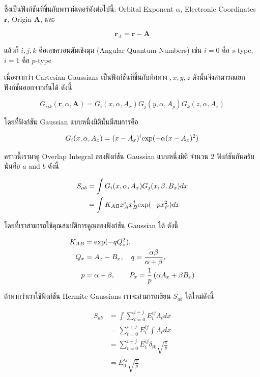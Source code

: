 \noindent ซึ่งเป็นฟังก์ชันที่ขึ้นกับพารามิเตอร์ดังต่อไปนี้: Orbital Exponent $\alpha$, Electronic Coordinates $\mathbf{r}$,
Origin $\mathbf{A}$, และ

\begin{equation}
  \mathbf{r}_A 
  = 
  \mathbf{r} - \mathbf{A}
\end{equation}

\noindent แล้วก็ $i,j,k$ คือเลขควอนตัมเชิงมุม (Angular Quantum Numbers) เช่น $i=0$ คือ $s$-type, $i=1$ คือ $p$-type 

เนื่องจากว่า Cartesian Gaussians เป็นฟังก์ชันที่ขึ้นกับทิศทาง $,x ,y, z$ ดังนั้นจึงสามารถแยกฟังก์ชันออกจากกันได้ ดังนี้

\begin{equation}
  G_{ijk}(\mathbf{r}, \alpha, \mathbf{A}) 
  = 
  G_i(x,\alpha,A_x)G_j(y,\alpha,A_y)G_k(z,\alpha,A_z)
\end{equation}

\noindent โดยที่ฟังก์ชัน Gaussian แบบหนึ่งมิตินั้นมีสมการคือ 

\begin{equation}
  G_i(x,\alpha,A_x) 
  = 
  (x - A_x)^i \hbox{exp}(-\alpha(x-A_x)^2)
\end{equation}

คราวนี้เรามาดู Overlap Integral ของฟังก์ชัน Gaussian แบบหนึ่งมิติ จำนวน 2 ฟังก์ชันกันครับ นั่นคือ $a$ and $b$ ดังนี้

\begin{align}
  S_{ab} 
  &= \int G_i(x,\alpha,A_x) G_j(x,\beta,B_x) dx \\
  &= \int K_{AB} x^i_A x^j_B \hbox{exp}(-p x_P^2) dx
\end{align}

\noindent โดยที่เราสามารถใช้คุณสมบัติการคูณของฟังก์ชัน Gaussian ได้ ดังนี้ 

\begin{align}
  K_{AB} 
  &= \hbox{exp}(-q Q_x^2),\\ 
  Q_x &= A_x - B_x, \quad q = \frac{\alpha\beta}{\alpha + \beta}, \\ 
  p &= \alpha + \beta,\quad  \quad P_x = \frac{1}{p}\left(\alpha A_x + \beta B_x\right)
\end{align}

\noindent ถ้าหากว่าเราใช้ฟังก์ชัน Hermite Gaussians เราจะสามารถเขียน $S_{ab}$ ได้ใหม่ดังนี้

\begin{align}
  S_{ab} 
  &= \int \sum\limits_{t=0}^{i+j} E_{t}^{ij} \Lambda_t dx \\
  &= \sum\limits_{t=0}^{i+j} E_{t}^{ij} \int \Lambda_t dx \\
  &= \sum\limits_{t=0}^{i+j} E_{t}^{ij} \delta_{t0} \sqrt{\frac{\pi}{p}} \\ 
  &= E_{0}^{ij} \sqrt{\frac{\pi}{p}} 
\end{align}

